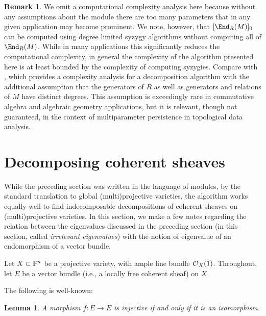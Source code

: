\documentclass[12pt]{article}
\theoremstyle{theorem}
\numberwithin{thm}{section}
\newtheorem{lem}[thm]{Lemma}
\theoremstyle{definition}
\newtheorem{rem}[thm]{Remark}
\begin{document}
\begin{rem}
  We omit a computational complexity analysis here because without any assumptions about the module there are too many parameters that in any given application may become prominent. We note, however, that $[\End_R(M)]_0$ can be computed using degree limited syzygy algorithms without computing all of $\End_R(M)$. While in many applications this significantly reduces the computational complexity, in general the complexity of the algorithm presented here is at least bounded by the complexity of computing syzygies. Compare with \cite{DX22}, which provides a complexity analysis for a decomposition algorithm with the additional assumption that the generators of $R$ as well as generators and relations of $M$ have distinct degrees. This assumption is exceedingly rare in commutative algebra and algebraic geometry applications, but it is relevant, though not guaranteed, in the context of multiparameter persistence in topological data analysis.
\end{rem}

\section{Decomposing coherent sheaves}

While the preceding section was written in the language of modules, by the standard translation to global (multi)projective varieties, the algorithm works equally well to find indecomposable decompositions of coherent sheaves on (multi)projective varieties.
In this section, we make a few notes regarding the relation between the eigenvalues discussed in the preceding section (in this section, called \emph{irrelevant eigenvalues}) with the notion of eigenvalue of an endomorphism of a vector bundle.

Let $X\subset \P^n$ be a projective variety, with ample line bundle $\O_X(1)$.
Throughout, let $E$ be a vector bundle (i.e., a locally free coherent sheaf) on $X$.

The following is well-known:

\begin{lem}{{\cite[Exercise~4.1]{Friedman}}}
A morphism $f:E\to E$ is injective if and only if it is an isomorphism.
\end{lem}


\end{document}
